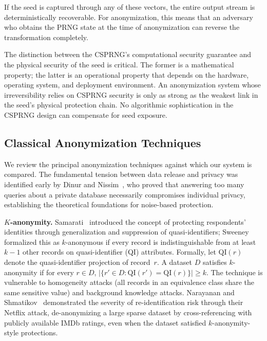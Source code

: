 \documentclass[journal]{IEEEtran}
\begin{document}
If the seed is captured through any of these vectors, the entire output stream is deterministically recoverable. For anonymization, this means that an adversary who obtains the PRNG state at the time of anonymization can reverse the transformation completely.

The distinction between the CSPRNG's computational security guarantee and the physical security of the seed is critical. The former is a mathematical property; the latter is an operational property that depends on the hardware, operating system, and deployment environment. An anonymization system whose irreversibility relies on CSPRNG security is only as strong as the weakest link in the seed's physical protection chain. No algorithmic sophistication in the CSPRNG design can compensate for seed exposure.

\subsection{Classical Anonymization Techniques}
\label{subsec:classical_anon}

We review the principal anonymization techniques against which our system is compared. The fundamental tension between data release and privacy was identified early by Dinur and Nissim~\cite{dinur2003revealing}, who proved that answering too many queries about a private database necessarily compromises individual privacy, establishing the theoretical foundations for noise-based protection.

\textbf{$K$-anonymity.} Samarati~\cite{samarati2001protecting} introduced the concept of protecting respondents' identities through generalization and suppression of quasi-identifiers; Sweeney~\cite{sweeney2002kanon} formalized this as $k$-anonymous if every record is indistinguishable from at least $k{-}1$ other records on quasi-identifier (QI) attributes. Formally, let $\mathrm{QI}(r)$ denote the quasi-identifier projection of record~$r$. A dataset $D$ satisfies $k$-anonymity if for every $r \in D$, $|\{r' \in D : \mathrm{QI}(r') = \mathrm{QI}(r)\}| \geq k$. The technique is vulnerable to homogeneity attacks (all records in an equivalence class share the same sensitive value) and background knowledge attacks. Narayanan and Shmatikov~\cite{narayanan2008robust} demonstrated the severity of re-identification risk through their Netflix attack, de-anonymizing a large sparse dataset by cross-referencing with publicly available IMDb ratings, even when the dataset satisfied $k$-anonymity-style protections.
\end{document}
